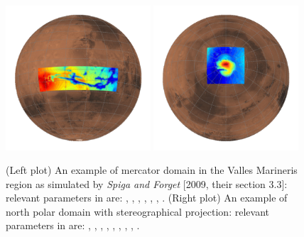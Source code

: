 \footnotesize
{}
\normalsize

\begin{figure}[h!] 
\begin{center}
\includegraphics[width=0.48\textwidth]{valles.png}
\includegraphics[width=0.48\textwidth]{LMD_MMM_d1_20km_domain_100.png} 
\end{center}
\caption{\label{vallespolar} (Left plot) An example of mercator domain in the Valles Marineris region as simulated by \textit{Spiga and Forget} [2009, their section 3.3]: relevant parameters in  are: , , , , , , . (Right plot) An example of north polar domain with stereographical projection: relevant parameters in  are: , , , , , , , , .}
\end{figure}

